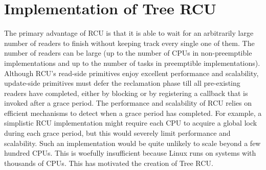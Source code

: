 \section{Implementation of Tree RCU}\label{sec:tree_rcu}

The primary advantage of RCU is that it is able to wait for an arbitrarily
large number of readers to finish without keeping track every single one of
them.  The number of readers can be large (up to the number of CPUs in
non-pre\-emptible implementations and up to the number of tasks in
preemptible implementations).
%
Although RCU's read-side primitives enjoy excellent performance and scalability, 
update-side primitives must defer the reclamation phase till all pre-existing 
readers have completed, either by blocking or by registering a callback that is 
invoked after a grace period. The performance and scalability of RCU relies on 
efficient mechanisms to detect when a grace period has completed. 
%
For example, a simplistic RCU implementation might require each CPU to
acquire a global lock during each grace period, but this would severely
limit performance and scalability.
Such an implementation would be quite unlikely to scale beyond
a few hundred CPUs.
This is woefully insufficient because Linux runs on systems with thousands
of CPUs.
This has motivated the creation of Tree RCU.

